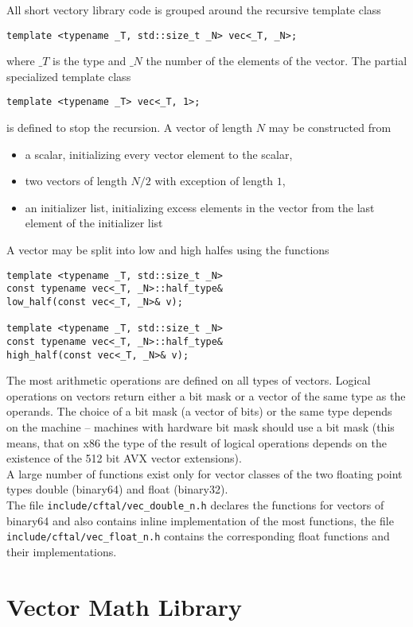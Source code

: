 \documentclass[10pt,a4paper,draft]{article}
\numberwithin{equation}{subsection}
\begin{document}
All short vectory library code is grouped around the recursive template
class
\begin{lstlisting}
template <typename _T, std::size_t _N> vec<_T, _N>;
\end{lstlisting}
where $\_T$ is the type and $\_N$ the number of the elements of the
vector. The partial specialized template class
\begin{lstlisting}
template <typename _T> vec<_T, 1>;
\end{lstlisting}
is defined to stop the recursion.
%
A vector of length $N$ may be constructed from
\begin{itemize}
\item a scalar, initializing every vector element to the scalar,
\item two vectors of length $N/2$ with exception of length $1$,
\item an initializer list, initializing excess elements in the
  vector from the last element of the initializer list
\end{itemize}
A vector may be split into low and high halfes using the functions
\begin{lstlisting}
template <typename _T, std::size_t _N>
const typename vec<_T, _N>::half_type&
low_half(const vec<_T, _N>& v);

template <typename _T, std::size_t _N>
const typename vec<_T, _N>::half_type&
high_half(const vec<_T, _N>& v);
\end{lstlisting}
The most arithmetic operations are defined on all types of vectors.
Logical operations on vectors return either a bit mask or a vector of
the same type as the operands. The choice of a bit mask (a vector of
bits) or the same type depends on the machine -- machines with
hardware bit mask should use a bit mask (this means, that on x86 the
type of the result of logical operations depends on the existence of
the 512 bit AVX vector extensions). \\[10pt]
%
A large number of functions exist only for vector classes of the
two floating point types double (binary64) and float (binary32).\\
The file \texttt{include/cftal/vec\_double\_n.h} declares the functions
for vectors of binary64 and also contains inline implementation of
the most functions, the file \texttt{include/cftal/vec\_float\_n.h} contains
the corresponding float functions and their implementations.

\section{Vector Math Library}
\label{sec:vec_math_lib}
\end{document}
